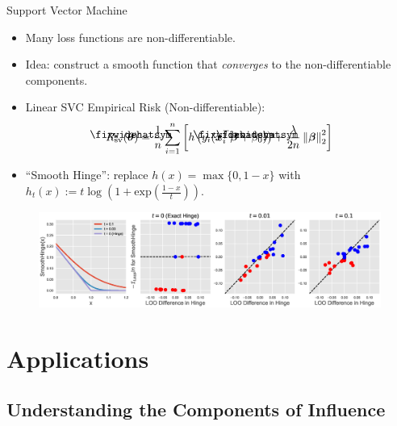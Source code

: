 \documentclass[blue]{beamer}
\newcommand\lowerwidehatsym{%
  \text{\smash{\raisebox{-1.3ex}{%
    $\fixwidehatsym$}}}}
\newcommand\fixwidehat[1]{%
  \mathchoice
    {\accentset{\displaystyle\lowerwidehatsym}{#1}}
    {\accentset{\textstyle\lowerwidehatsym}{#1}}
    {\accentset{\scriptstyle\lowerwidehatsym}{#1}}
    {\accentset{\scriptscriptstyle\lowerwidehatsym}{#1}}
}
\newenvironment{figure*}%
{\begin{figure}}
{\end{figure}}
\begin{document}
\begin{frame}{Support Vector Machine}

\begin{itemize}
  \item Many loss functions are non-differentiable.
  \item Idea: construct a smooth function that \emph{converges} to the non-differentiable components.
  \item Linear SVC Empirical Risk (Non-differentiable):
  \begin{align}\label{svc_R}
\vspace{-0.2in}
R_{\text{sv}}(\fixwidehat{\bm{\theta}}) = \frac{1}{n}\sum_{i=1}^n \left[h\left(y_i(\bm{x}_i^{\top} \fixwidehat{\bm{\beta}} + \fixwidehat{\beta_0})\right) + \frac{\lambda}{2n} \left\lVert \bm{\beta}\right\rVert_2^2\right]
\vspace{-0.2in}
\end{align}
\item ``Smooth Hinge'': replace $h(x) = \max\{0, 1-x\}$ with $h_t(x) := t\log(1+\text{exp}(\frac{1-x}{t}))$.
\end{itemize}


\begin{figure}
\vskip 0.0in
\begin{center}
\centerline{\includegraphics[width=1.0\columnwidth]{fig-svm}}
\vskip -0.1in
\label{fig_svm}
\end{center}
\vskip -0.2in
\end{figure} 

\end{frame}


\section{Applications}

\subsection{Understanding the Components of Influence}
\end{document}

